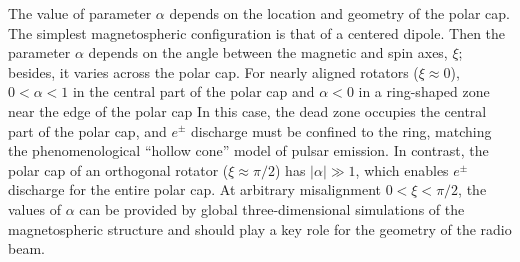 The value of parameter $\alpha$ depends
on the location and geometry of the polar cap.
The simplest magnetospheric configuration is that of a centered dipole. Then
the parameter $\alpha$ depends on the angle between the magnetic and spin axes,
$\xi$; besides, it varies across the polar cap. For nearly
aligned rotators ($\xi\approx 0$),
$0<\alpha<1$ in the central part of the polar cap and $\alpha<0$
in a ring-shaped zone near the edge of the polar cap
\citep{timokhin_force-free_2006,parfrey_introducing_2012}
In this case, the dead zone occupies the
central part of the polar cap, and $e^\pm$ discharge must be confined to the ring,
matching the phenomenological ``hollow cone'' model of pulsar emission.
In contrast, the polar cap of an orthogonal rotator ($\xi\approx \pi/2$) has
$|\alpha|\gg 1$, which
enables $e^\pm$ discharge
for the entire polar cap.
At arbitrary misalignment $0<\xi<\pi/2$,
the values of $\alpha$
can be provided by global three-dimensional simulations
of the magnetospheric structure
\citep[e.g.][]{spitkovsky_time-dependent_2006}
and should play a key
role for the geometry of the radio beam.




